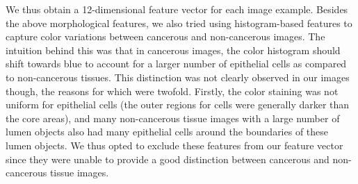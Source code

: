 We thus obtain a 12-dimensional feature vector for each image example. Besides the above morphological features, we also tried using histogram-based features to capture color variations between cancerous and non-cancerous images. The intuition behind this was that in cancerous images, the color histogram should shift towards blue to account for a larger number of epithelial cells as compared to non-cancerous tissues. This distinction was not clearly observed in our images though, the reasons for which were twofold. Firstly, the color staining was not uniform for epithelial cells (the outer regions for cells were generally darker than the core areas), and many non-cancerous tissue images with a large number of lumen objects also had many epithelial cells around the boundaries of these lumen objects. We thus opted to exclude these features from our feature vector since they were unable to provide a good distinction between cancerous and non-cancerous tissue images.

\label{sec:image_based_approaches}